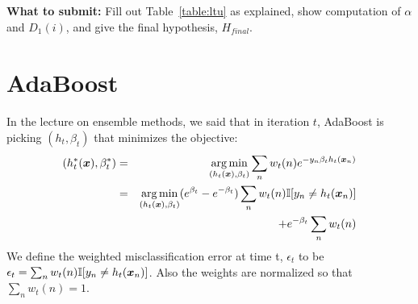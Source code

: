 \documentclass[11pt]{article}
\begin{document}
\textbf{What to submit:} Fill out Table~\ref{table:ltu} as explained, show computation of $\alpha$ and $D_1(i)$, and give the final hypothesis, $H_{\textit{final}}$.



\iffalse
\section{AdaBoost }

In the lecture on ensemble methods, we said that in iteration $t$, AdaBoost is picking $(h_t, \beta_t)$ that minimizes the objective:
\begin{eqnarray*}
(h_t^*(\boldsymbol{x}), \beta_t^*) & = & \operatorname*{arg\,min}_{(h_t(\boldsymbol{x}), \beta_t)}\sum_n w_t(n) e^{-y_n \beta_t h_t(\boldsymbol{x}_n)} \\ 
& =& \operatorname*{arg\,min}_{(h_t(\boldsymbol{x}), \beta_t)}(e^{\beta_t}- e^{-\beta_t})  \sum_n w_t(n)\mathbb{I}[y_n \ne h_t(\boldsymbol{x}_n)] \\
&& \qquad\qquad\qquad\qquad\qquad + e^{-\beta_t} \sum_n w_t(n)
\end{eqnarray*}
We define the weighted misclassification error at time t, $\epsilon_t$ to be $\epsilon_t = \sum_n w_t(n)\mathbb{I}[y_n \ne h_t(\boldsymbol{x}_n)]$. Also the weights are normalized so that $\sum_n w_t(n)=1$. 
\end{document}
